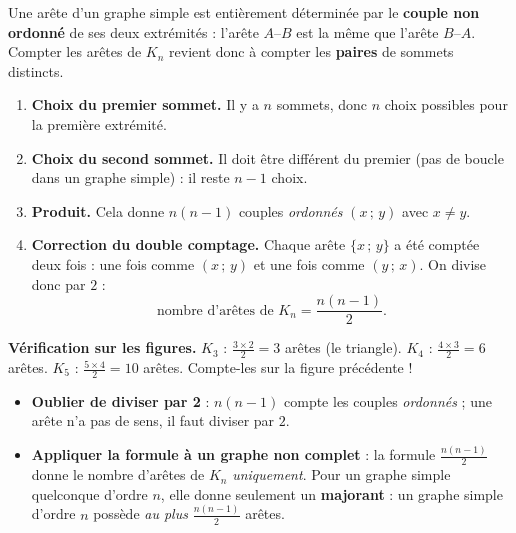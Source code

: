 \documentclass[11pt]{article}
\begin{document}
\begin{experience}
Une arête d'un graphe simple est entièrement déterminée par le \textbf{couple non ordonné} de ses deux extrémités : l'arête $A$--$B$ est la même que l'arête $B$--$A$. Compter les arêtes de $K_n$ revient donc à compter les \textbf{paires} de sommets distincts.
\begin{enumerate}
\item \textbf{Choix du premier sommet.} Il y a $n$ sommets, donc $n$ choix possibles pour la première extrémité.
\item \textbf{Choix du second sommet.} Il doit être différent du premier (pas de boucle dans un graphe simple) : il reste $n-1$ choix.
\item \textbf{Produit.} Cela donne $n(n-1)$ couples \emph{ordonnés} $(x\,;\,y)$ avec $x \neq y$.
\item \textbf{Correction du double comptage.} Chaque arête $\{x\,;\,y\}$ a été comptée deux fois : une fois comme $(x\,;\,y)$ et une fois comme $(y\,;\,x)$. On divise donc par $2$ :
\[ \text{nombre d'arêtes de } K_n = \frac{n(n-1)}{2}. \]
\end{enumerate}
\textbf{Vérification sur les figures.} $K_3$ : $\frac{3 \times 2}{2} = 3$ arêtes (le triangle). $K_4$ : $\frac{4 \times 3}{2} = 6$ arêtes. $K_5$ : $\frac{5 \times 4}{2} = 10$ arêtes. Compte-les sur la figure précédente !
\end{experience}

\begin{attention}
\begin{itemize}
\item \textbf{Oublier de diviser par 2} : $n(n-1)$ compte les couples \emph{ordonnés} ; une arête n'a pas de sens, il faut diviser par $2$.
\item \textbf{Appliquer la formule à un graphe non complet} : la formule $\frac{n(n-1)}{2}$ donne le nombre d'arêtes de $K_n$ \emph{uniquement}. Pour un graphe simple quelconque d'ordre $n$, elle donne seulement un \textbf{majorant} : un graphe simple d'ordre $n$ possède \emph{au plus} $\frac{n(n-1)}{2}$ arêtes.
\end{itemize}
\end{attention}
\end{document}
